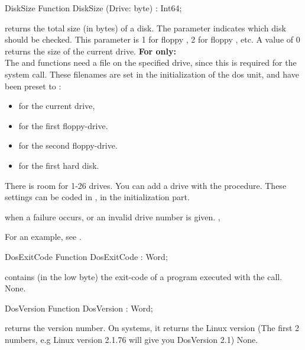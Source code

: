 \latex{}
\html{}
\begin{function}{DiskSize}
\Declaration
Function DiskSize (Drive: byte) : Int64;

\Description

 returns the total size (in bytes) of a disk. The parameter
 indicates which disk should be checked. This parameter is 1 for
floppy , 2 for floppy , etc. A value of 0 returns the size
of the current drive. 
\textbf{For \linux only:}\\
The  and  functions need a file on the specified drive, since this
is required for the  system call.
  These filenames are set in the initialization of the dos unit, and have 
been preset to :
\begin{itemize}
\item {} for the current drive, 
\item {} for the first floppy-drive.
\item {} for the second floppy-drive.
\item {} for the first hard disk.
\end{itemize}
There is room for 1-26 drives. You can add a drive with the
 procedure.
These settings can be coded in , in the initialization part.

 when a failure occurs, or an invalid drive number is given.
\SeeAlso
{}, 
\end{function}
For an example, see .
\begin{function}{DosExitCode}
\Declaration
Function DosExitCode  : Word;

\Description

 contains (in the low byte) the exit-code of a program 
executed with the  call.
\Errors
None.
\SeeAlso
{}
\end{function}
\latex{}
\html{}
\begin{function}{DosVersion}
\Declaration
Function DosVersion  : Word;

\Description
{} returns the \dos version number. On \linux systems, it
returns the Linux version (The first 2 numbers, e.g Linux version 2.1.76 will
give you DosVersion 2.1)
\Errors
None.
\SeeAlso

\end{function}


